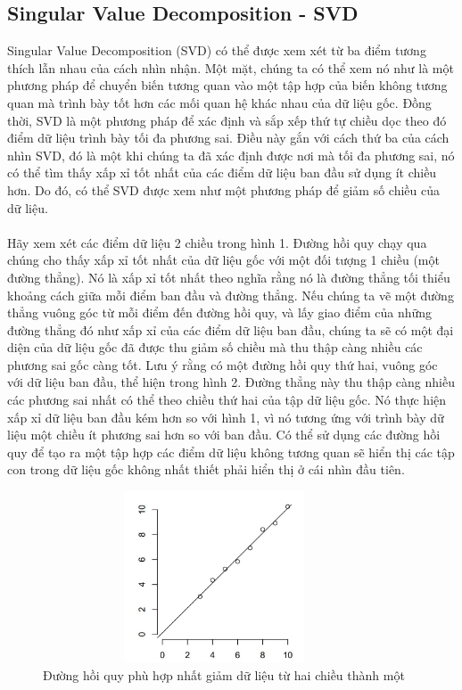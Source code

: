 \subsection{Singular Value Decomposition - SVD}
Singular Value Decomposition (SVD) có thể được xem xét từ ba điểm tương thích
lẫn nhau của cách nhìn nhận. Một mặt, chúng ta có thể xem nó như là một phương
pháp để chuyển biến tương quan vào một tập hợp của biến không tương quan mà
trình bày tốt hơn các mối quan hệ khác nhau của dữ liệu gốc. Đồng thời, SVD là
một phương pháp để xác định và sắp xếp thứ tự chiều dọc theo đó điểm dữ liệu
trình bày tối đa phương sai. Điều này gắn với cách thứ ba của cách nhìn SVD, đó
là một khi chúng ta đã xác định được nơi mà tối đa phương sai, nó có thể tìm
thấy xấp xỉ tốt nhất của các điểm dữ liệu ban đầu sử dụng ít chiều hơn. Do đó,
có thể SVD được xem như một phương pháp để giảm số chiều của dữ liệu.\\\\
Hãy xem xét các điểm dữ liệu 2 chiều trong hình 1. Đường hồi quy chạy qua chúng
cho thấy xấp xỉ tốt nhất của dữ liệu gốc với một đối tượng 1 chiều (một đường
thẳng). Nó là xấp xỉ tốt nhất theo nghĩa rằng nó là đường thẳng tối thiểu khoảng
cách giữa mỗi điểm ban đầu và đường thẳng. Nếu chúng ta vẽ một đường thẳng vuông
góc từ mỗi điểm đến đường hồi quy, và lấy giao điểm của những đường thẳng đó như
xấp xỉ của các điểm dữ liệu ban đầu, chúng ta sẽ có một đại diện của dữ liệu gốc
đã được thu giảm số chiều mà thu thập càng nhiều các phương sai gốc càng tốt.
Lưu ý rằng có một đường hồi quy thứ hai, vuông góc với dữ liệu ban đầu, thể hiện
trong hình 2. Đường thẳng này thu thập càng nhiều các phương sai nhất có thể
theo chiều thứ hai của tập dữ liệu gốc. Nó thực hiện xấp xỉ dữ liệu ban đầu kém
hơn so với hình 1, vì nó tương ứng với trình bày dữ liệu một chiều ít phương sai
hơn so với ban đầu. Có thể sử dụng các đường hồi quy để tạo ra một tập hợp các
điểm dữ liệu không tương quan sẽ hiển thị các tập con trong dữ liệu gốc không
nhất thiết phải hiển thị ở cái nhìn đầu tiên.\\
\begin{figure}[h!]
	\centering 
	\includegraphics[width=4in,height=2in,keepaspectratio=true]{SVD1.png}
	\caption{Đường hồi quy phù hợp nhất giảm dữ liệu từ hai chiều thành một}
\end{figure}\\
